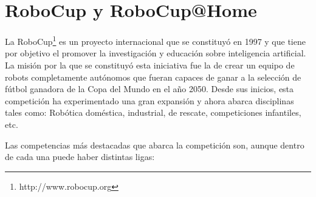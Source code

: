 \section{RoboCup y RoboCup@Home}
\label{cap:robocup}
La RoboCup\footnote{http://www.robocup.org} es un proyecto internacional que se constituyó en 1997 y que tiene por objetivo el promover la investigación y educación sobre inteligencia artificial. La misión por la que se constituyó esta iniciativa fue la de crear un equipo de robots completamente autónomos que fueran capaces de ganar a la selección de fútbol ganadora de la Copa del Mundo en el año 2050. Desde sus inicios, esta competición ha experimentado una gran expansión y ahora abarca disciplinas tales como: Robótica doméstica, industrial, de rescate, competiciones infantiles, etc.

Las competencias más destacadas que abarca la competición son, aunque dentro de cada una puede haber distintas ligas:
